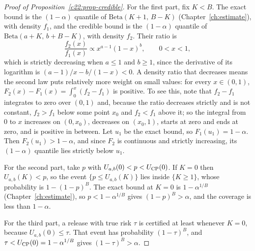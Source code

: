 \begin{proof}[Proof of Proposition~\ref{c22:prop-credible}]
For the first part, fix $K<B$. The exact bound is the $(1-\alpha)$ quantile of $\mathrm{Beta}(K+1,\,B-K)$ (Chapter~\ref{ch:estimate}), with density $f_1$, and the
credible bound is the $(1-\alpha)$ quantile of $\mathrm{Beta}(a+K,\,b+B-K)$, with density $f_2$. Their ratio is
\[\frac{f_2(x)}{f_1(x)}\propto x^{a-1}(1-x)^{b},\qquad0<x<1,\]
which is strictly decreasing when $a\le1$ and $b\ge1$, since the derivative of its logarithm is $(a-1)/x-b/(1-x)<0$. A density
ratio that decreases means the second law puts relatively more weight on small values: for every $x\in(0,1)$,
$F_2(x)-F_1(x)=\int_0^x(f_2-f_1)$ is positive. To see this, note that $f_2-f_1$ integrates to zero over $(0,1)$ and, because the
ratio decreases strictly and is not constant, $f_2>f_1$ below some point $x_0$ and $f_2<f_1$ above it; so the integral from 0 to $x$
increases on $(0,x_0)$, decreases on $(x_0,1)$, starts at zero and ends at zero, and is positive in between. Let $u_1$ be the
exact bound, so $F_1(u_1)=1-\alpha$. Then $F_2(u_1)>1-\alpha$, and since $F_2$ is continuous and strictly increasing, its $(1-\alpha)$
quantile lies strictly below $u_1$.

For the second part, take $p$ with $U_{a,b}(0)<p<U_{\rm CP}(0)$. If $K=0$ then $U_{a,b}(K)<p$, so the event $\{p\le U_{a,b}(K)\}$ lies inside
$\{K\ge1\}$, whose probability is $1-(1-p)^B$. The exact bound at $K=0$ is $1-\alpha^{1/B}$ (Chapter~\ref{ch:estimate}), so $p<1-\alpha^{1/B}$ gives
$(1-p)^B>\alpha$, and the coverage is less than $1-\alpha$.

For the third part, a release with true risk $\tau$ is certified at least whenever $K=0$, because $U_{a,b}(0)\le\tau$. That event has
probability $(1-\tau)^B$, and $\tau<U_{\rm CP}(0)=1-\alpha^{1/B}$ gives $(1-\tau)^B>\alpha$.
\end{proof}

